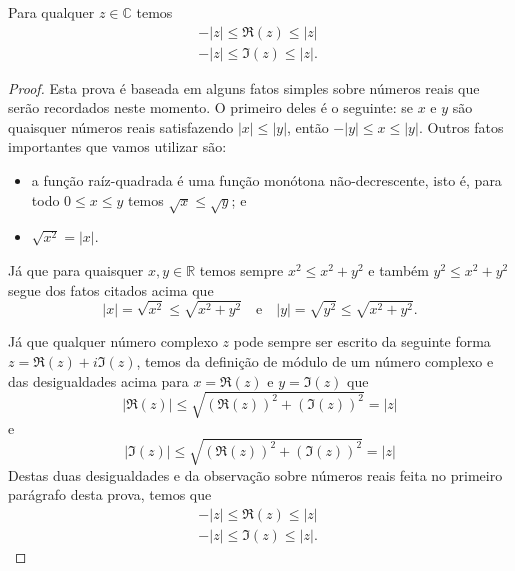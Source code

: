 \begin{lema}\label{lema-re-im-modulo}
Para qualquer $z\in\mathbb{C}$ temos 
\begin{align*}
-|z|\leqslant \Re(z)\leqslant |z|\phantom{.}
\\[0.3cm]
-|z|\leqslant \Im(z)\leqslant |z|.
\end{align*}
\end{lema}
\begin{proof}
Esta prova é baseada em alguns fatos simples sobre números reais que serão recordados neste momento.
O primeiro deles é o seguinte: se $x$ e $y$ são quaisquer números reais satisfazendo $|x|\leq |y|$,
então $-|y|\leqslant x\leqslant |y|$. Outros fatos importantes que vamos utilizar são:
\begin{itemize}
\item a função raíz-quadrada é uma função monótona não-decrescente, isto é, 
para todo $0\leqslant x\leqslant y$ temos $\sqrt{x}\leqslant\sqrt{y}$; e 
\item $\sqrt{x^2}=|x|$. 
\end{itemize}

Já que para quaisquer $x,y\in\mathbb{R}$
temos sempre $x^2\leqslant x^2+y^2$ e também $y^2\leqslant x^2+y^2$ 
segue dos fatos citados acima que  
\[
|x| = \sqrt{x^2}\leqslant\sqrt{x^2+y^2}
\quad\text{e}\quad
|y| = \sqrt{y^2}\leqslant\sqrt{x^2+y^2}.
\]


Já que qualquer número complexo $z$ pode sempre ser escrito da seguinte forma $z=\Re(z)+i\Im(z)$,
temos da definição de módulo de um número complexo e das desigualdades acima para $x=\Re(z)$ e $y=\Im(z)$ que 
\[
|\Re(z)| \leqslant  \sqrt{(\Re(z))^2+(\Im(z))^2} = |z|
\]
e
\[
|\Im(z)| \leqslant  \sqrt{(\Re(z))^2+(\Im(z))^2} = |z|
\]
Destas duas desigualdades e da observação sobre números reais feita no primeiro parágrafo desta prova, temos que 
\begin{align*}
-|z|\leqslant \Re(z)\leqslant |z|\phantom{.}
\\[0.3cm]
-|z|\leqslant \Im(z)\leqslant |z|.
\end{align*}
\end{proof}


